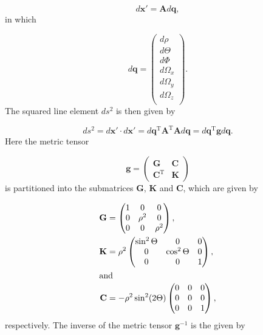 \begin{equation}
d\mathbf{x}' = \mathbf{A}d\mathbf{q},
\end{equation} 
in which      

\begin{equation}
d\mathbf{q} =
\begin{pmatrix}
d\rho\\
d\Theta\\
d\Phi\\
d\Omega_x\\
d\Omega_y\\
d\Omega_z\\
\end{pmatrix}.
\end{equation}
The squared line element $d s^2$ is then given by 

\begin{equation}
d s^2 = d\mathbf{x}' \cdot d\mathbf{x}' = d\mathbf{q}^{\mathrm{T}} \mathbf{A}^{\mathrm{T}} \mathbf{A}d\mathbf{q} = d\mathbf{q}^{\mathrm{T}} \mathbf{g} d\mathbf{q}.
\end{equation}
Here the metric tensor

\begin{equation}
\mathbf{g}=
\begin{pmatrix}
\mathbf{G} & \mathbf{C}\\
\mathbf{C}^\mathrm{T} & \mathbf{K}
\end{pmatrix}
\end{equation}
is partitioned into the submatrices $\mathbf{G}$, $\mathbf{K}$ and $\mathbf{C}$, which are given by 

\begin{align}
\mathbf{G} &=
\begin{pmatrix}
1 & 0      & 0\\
0 & \rho^2 & 0\\
0 & 0      & \rho^2
\end{pmatrix},\\
\mathbf{K} &=
\rho^2
\begin{pmatrix}
\sin^2\Theta & 0            & 0\\
0            & \cos^2\Theta & 0\\
0            & 0            & 1
\end{pmatrix},\\
\intertext{and}
\mathbf{C} &=
-\rho^2\sin^2(2\Theta)
\begin{pmatrix}
0 & 0 & 0\\
0 & 0 & 0\\
0 & 0 & 1
\end{pmatrix},
\end{align}
respectively. The inverse of the metric tensor $\mathbf{g}^{-1}$ is the given by

